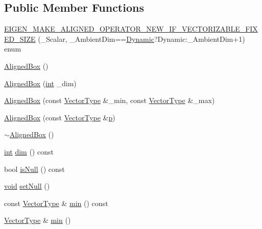 \subsection*{Public Member Functions}
\begin{DoxyCompactItemize}
\item 
\hyperlink{class_aligned_box_a6a6fc056ce62ba4c96265f609f2e968c}{E\-I\-G\-E\-N\-\_\-\-M\-A\-K\-E\-\_\-\-A\-L\-I\-G\-N\-E\-D\-\_\-\-O\-P\-E\-R\-A\-T\-O\-R\-\_\-\-N\-E\-W\-\_\-\-I\-F\-\_\-\-V\-E\-C\-T\-O\-R\-I\-Z\-A\-B\-L\-E\-\_\-\-F\-I\-X\-E\-D\-\_\-\-S\-I\-Z\-E} (\-\_\-\-Scalar, \-\_\-\-Ambient\-Dim==\hyperlink{_constants_8h_adc9da5be31bdce40c25a92c27999c0e3}{Dynamic}?Dynamic\-:\-\_\-\-Ambient\-Dim+1) enum
\item 
\hyperlink{class_aligned_box_ae2ca2681d661836f655dd14564ba2dc9}{Aligned\-Box} ()
\item 
\hyperlink{class_aligned_box_a9ea1fac6984062314598eaa06477b7d5}{Aligned\-Box} (\hyperlink{ioapi_8h_a787fa3cf048117ba7123753c1e74fcd6}{int} \-\_\-dim)
\item 
\hyperlink{class_aligned_box_a14a114a9017a4297a9098fd2e04b240c}{Aligned\-Box} (const \hyperlink{class_aligned_box_a0c3d2a6c755e0ad65a6e45371a4079ef}{Vector\-Type} \&\-\_\-min, const \hyperlink{class_aligned_box_a0c3d2a6c755e0ad65a6e45371a4079ef}{Vector\-Type} \&\-\_\-max)
\item 
\hyperlink{class_aligned_box_afc0b407e6686fc80025ae6084bd4d49a}{Aligned\-Box} (const \hyperlink{class_aligned_box_a0c3d2a6c755e0ad65a6e45371a4079ef}{Vector\-Type} \&\hyperlink{glext_8h_aa5367c14d90f462230c2611b81b41d23}{p})
\item 
\hyperlink{class_aligned_box_a1d4291e86bb29ef8c12d1880319bbe27}{$\sim$\-Aligned\-Box} ()
\item 
\hyperlink{ioapi_8h_a787fa3cf048117ba7123753c1e74fcd6}{int} \hyperlink{class_aligned_box_a6c7e7fdb499bdc19c564fd5fca32f8c1}{dim} () const 
\item 
bool \hyperlink{class_aligned_box_ad6139a86188b9a1a762f7858f1079d1d}{is\-Null} () const 
\item 
\hyperlink{group___u_a_v_objects_plugin_ga444cf2ff3f0ecbe028adce838d373f5c}{void} \hyperlink{class_aligned_box_aae255dc5c90e8e0680e4e4e8193fedbf}{set\-Null} ()
\item 
const \hyperlink{class_aligned_box_a0c3d2a6c755e0ad65a6e45371a4079ef}{Vector\-Type} \& \hyperlink{class_aligned_box_a33ef70ea20ee681e83b7fd82016eecdc}{min} () const 
\item 
\hyperlink{class_aligned_box_a0c3d2a6c755e0ad65a6e45371a4079ef}{Vector\-Type} \& \hyperlink{class_aligned_box_a6a94ac6fd18fd7ff96e7f4438096bf27}{min} ()

\end{DoxyCompactItemize}
